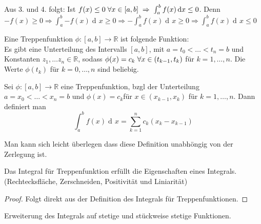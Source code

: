 \documentclass[a4paper,titlepage,oneside]{article}
\def\R{\ensuremath{\mathbb{R}} }
\newcommand{\der}{\operatorname{d\!}{}}
\def\fa{\ensuremath{\forall}}
\def\sp{\hspace{0,1cm}}
\newcommand{\integral}[4][x]{\ensuremath{\int_{#2}^{#3}{#4\der #1}}}
\newcommand{\intAB}[2][x]{\integral[#1]{a}{b}{#2}}
\theoremstyle{thmstyle}
\begin{document}
\begin{bem}
Aus 3. und 4. folgt: Ist $ f(x) \le 0 \sp \fa x \in [a,b] \sp \Rightarrow \sp \intAB{f(x)} \le 0$. Denn $-f(x) \ge 0 \Rightarrow \intAB{-f(x)} \ge 0 \Rightarrow -\intAB{f(x)} \ge 0 \Rightarrow \intAB{f(x)} \le 0$
\end{bem}

\begin{defi}
Eine Treppenfunktion $\phi : [a,b] \to \R$ ist folgende Funktion: \\
Es gibt eine Unterteilung des Intervalls $[a,b]$, mit $a = t_0 < \dots < t_n = b$ und Konstanten $ z_1, \dots z_n \in \R$, sodass $\phi(x) = c_k \sp \fa x\in (t_{k-1},t_k) $ für $k = 1,\dots, n$. Die Werte $\phi(t_k) $ für $k = 0,\dots, n$ sind beliebig.
\end{defi}

\begin{defi}
Sei $\phi : [a,b] \to \R$ eine Treppenfunktion, bzgl der Unterteilung $a = x_0 < \dots < x_n = b$ und $\phi(x) = c_k $für $x \in (x_{k-1}, x_k) $ für $k = 1,\dots, n$. Dann definiert man \[ \intAB{f(x)} = \sum_{k=1}^{n}{c_k(x_k - x_{k-1})} \]
\end{defi}

\begin{bem}
Man kann sich leicht überlegen dass diese Definition unabhöngig von der Zerlegung ist.
\end{bem}

\begin{prop}
Das Integral für Treppenfunktion erfüllt die Eigenschaften eines Integrals. (Rechtecksfläche, Zerschneiden, Positivität und Liniarität)
\begin{proof} Folgt direkt aus der Definition des Integrals für Treppenfunktionen.
\end{proof}
\end{prop}

\begin{bem}[Ziel]
Erweiterung des Integrals auf stetige und stückweise stetige Funktionen.
\end{bem}
\end{document}
